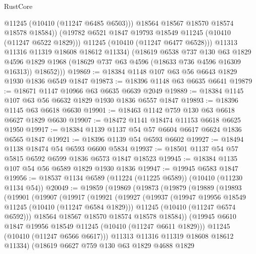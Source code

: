 \begin{lexlean}{RustCore}
\begin{coremodule}
                  @11245
                  (@10410 (@11247 @6485 @6503)))
                @18564
                @18567
                @18570
                @18574
                @18578
                @18584))
            (@19782 @6521 @1847 @19793 @18549 @11245 (@10410 (@11247 @6522 @1829)))
            @11245
            (@10410 (@11247 @6477 @6528)))
          @11313
          @11316
          @11319
          @18608
          @18612
          @11334)
        (@18619
          @6538
          @737
          @130
          @63
          @1829
          @4596
          @1829
          @1968
          (@18629 @737 @63 @4596 (@18633 @736 @4596 @16309 @16313))
          @18652)))
@19869 := @18384 @1148 @107 @63 @56 @6643 @1829 @1930 @1836 @6549 @1847
@19873 := @18396 @1148 @63 @6635 @6641
@19879 := @18671 @1147 @10966 @63 @6635 @6639 @2049
@19889 := @18384 @1145 @107 @63 @56 @6632 @1829 @1930 @1836 @6557 @1847
@19893 := @18396 @1145 @63 @6618 @6630
@19901 := @18463 @1142 @759 @130 @63 @6618 @6627 @1829 @6630
@19907 := @18472 @1141 @18474 @11153 @6618 @6625 @1950
@19917 := @18384 @1139 @1137 @54 @57 @6604 @6617 @6624 @1836 @6565 @1847
@19921 := @18396 @1139 @54 @6593 @6602
@19927 := @18494 @1138 @18474 @54 @6593 @6600 @5834
@19937 := @18501 @1137 @54 @57 @5815 @6592 @6599 @1836 @6573 @1847 @18523
@19945 := @18384 @1135 @107 @54 @56 @6589 @1829 @1930 @1836
@19947 := @19945 @6583 @1847
@19956 := @18537 @1134 @6589 (@11224 (@11225 @6589)) (@10410 (@11230 @1134 @54))
@20049 := @19859
    (@19869
      (@19873
        (@19879
          (@19889
            (@19893
              (@19901
                (@19907
                  (@19917
                    (@19921
                      (@19927
                        (@19937
                          (@19947 @19956 @18549 @11245 (@10410 (@11247 @6584 @1829)))
                          @11245
                          (@10410 (@11247 @6574 @6592)))
                        @18564
                        @18567
                        @18570
                        @18574
                        @18578
                        @18584))
                    (@19945 @6610 @1847 @19956 @18549 @11245 (@10410 (@11247 @6611 @1829)))
                    @11245
                    (@10410 (@11247 @6566 @6617)))
                  @11313
                  @11316
                  @11319
                  @18608
                  @18612
                  @11334)
                (@18619
                  @6627
                  @759
                  @130
                  @63
                  @1829
                  @4688
                  @1829

\end{coremodule}
\end{lexlean}
